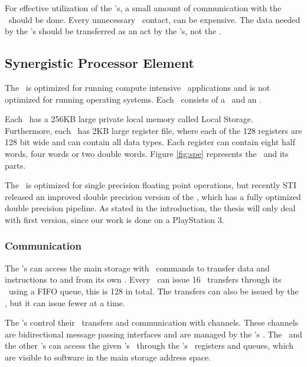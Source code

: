 For effective utilization of the \SPE{}'s, a small amount of
communication with the \PPE\ should be done. Every unnecessary \PPE\
contact, can be expensive. The data needed by the \SPE{}'s should be
transferred as an act by the \SPE{}'s, not the \PPE{}.

\subsection{Synergistic Processor Element}

The \SPE\ is optimized for running compute intensive
\SIMD\ applications and is not optimized for running operating
systems. Each \SPE\ consists of a \SPU\ and an \MFC{}.

Each \SPE\ has a 256KB large private local memory called Local
Storage. Furthermore, each \SPE\ has 2KB large register file, where
each of the 128 registers are 128 bit wide and can contain all data
types. Each register can contain eight half words, four words or two
double words. Figure \ref{fig:spe} represents the \SPE\ and its parts.

The \SPU\ is optimized for single precision floating point operations,
but recently STI released an improved double precision version of the
\CBE{}, which has a fully optimized double precision pipeline. As stated in the introduction, the thesis will only deal
with first version, since our work is done on a PlayStation 3.



\subsubsection{Communication}

The \SPE{}'s can access the main storage with \MFC\ commands to
transfer data and instructions to and from its own \LS{}. Every
\SPE\ can issue 16 \DMA\ transfers through its \MFC\ using a FIFO
queue, this is 128 in total. The transfers can also be issued by the
\PPE, but it can issue fewer at a time.

The \SPE{}'s control their \DMA\ transfers and communication with
channels. These channels are bidirectional message passing interfaces
and are managed by the \SPE{}'s \MFC{}. The \PPE\ and the
other \SPE{}'s can access the given \SPE{}'s \MFC\ through
the \MFC{}'s \MMIO\ registers and queues, which are visible to
software in the main storage address space.

